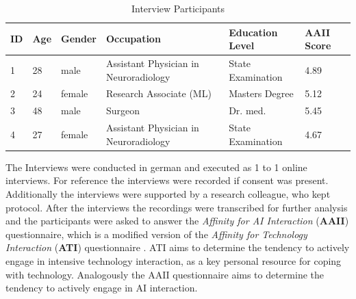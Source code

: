 \documentclass[11pt,a4paper,english]{scrreprt}
\begin{document}
\begin{table}[htbp]
    \centering
    \begin{tabularx}{\textwidth}{ l l l X X l }
        \toprule
        ID & Age & Gender & Occupation & Education Level & AAII Score \\
        \midrule
        1 & 28 & male & Assistant Physician in Neuroradiology & State Examination & 4.89 \\ 
        2 & 24 & female & Research Associate (ML) & Masters Degree & 5.12 \\ 
        3 & 48 & male & Surgeon & Dr. med. & 5.45 \\ 
        4 & 27 & female & Assistant Physician in Neuroradiology & State Examination & 4.67 \\ 
        \bottomrule
    \end{tabularx}
    \caption{Interview Participants}
    \label{table:interview_participants}
\end{table}

The Interviews were conducted in german and executed as 1 to 1 online interviews. For reference the interviews were recorded if consent was present. Additionally the interviews were supported by a research colleague, who kept protocol. After the interviews the recordings were transcribed for further analysis and the participants were asked to answer the \textit{Affinity for AI Interaction} (\textbf{AAII}) questionnaire, which is a modified version of the \textit{Affinity for Technology Interaction} (\textbf{ATI}) questionnaire \parencite{franke_personal_2019}. ATI aims to determine the tendency to actively engage in intensive technology interaction, as a key personal resource for coping with technology. Analogously the AAII questionnaire aims to determine the tendency to actively engage in AI interaction.
\end{document}
